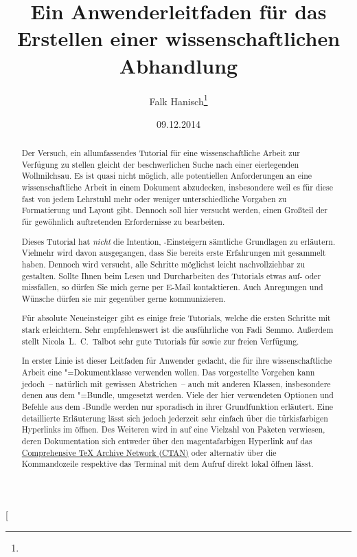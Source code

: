 \documentclass[%
  english,ngerman,%
  geometry=no,DIV=12,automark,%
]{tudscrartcl}
\begin{document}
\title{%
  Ein Anwenderleitfaden für das Erstellen einer wissenschaftlichen Abhandlung%
}
\author{Falk Hanisch\thanks{\noexpand\scriptsize\noexpand\Email{\tudscrmail}}}
\date{09.12.2014}
\makeatletter
\begingroup%
  \def\and{, }%
  \let\thanks\@gobble%
  \let\footnote\@gobble%
\endgroup%
\makeatother
\StartTutorial[%
  \begin{abstract}\noindent
  Der Versuch, ein allumfassendes Tutorial für eine wissenschaftliche Arbeit 
  zur Verfügung zu stellen gleicht der beschwerlichen Suche nach einer 
  eierlegenden Wollmilchsau. Es ist quasi nicht möglich, alle potentiellen 
  Anforderungen an eine wissenschaftliche Arbeit in einem Dokument abzudecken, 
  insbesondere weil es für diese fast von jedem Lehrstuhl mehr oder weniger 
  unterschiedliche Vorgaben zu Formatierung und Layout gibt. Dennoch soll hier 
  versucht werden, einen Großteil der für gewöhnlich auftretenden Erfordernisse 
  zu bearbeiten.
  
  Dieses Tutorial hat \emph{nicht} die Intention, -Einsteigern 
  sämtliche Grundlagen zu erläutern. Vielmehr wird davon ausgegangen, dass Sie 
  bereits erste Erfahrungen mit  gesammelt haben. Dennoch wird 
  versucht, alle Schritte möglichst leicht nachvollziehbar zu gestalten. Sollte 
  Ihnen beim Lesen und Durcharbeiten des Tutorials etwas auf- oder missfallen, 
  so dürfen Sie mich gerne per E-Mail kontaktieren. Auch Anregungen und Wünsche 
  dürfen sie mir gegenüber gerne kommunizieren.
  
  Für absolute Neueinsteiger gibt es einige freie Tutorials, welche die ersten 
  Schritte mit  stark erleichtern. Sehr empfehlenswert ist die 
  ausführliche  
  von Fadi~Semmo. Außerdem stellt Nicola~L.~C.~Talbot sehr gute Tutorials für 
  \cite{talbot2012} sowie 
  \cite{talbot2013} zur freien Verfügung.
  
  In erster Linie ist dieser Leitfaden für Anwender gedacht, die für ihre
  wissenschaftliche Arbeit eine \TUDScript"=Dokumentklasse verwenden wollen. 
  Das vorgestellte Vorgehen kann jedoch~-- natürlich mit gewissen Abstrichen~-- 
  auch mit anderen Klassen, insbesondere denen aus dem \KOMAScript"=Bundle, 
  umgesetzt werden. Viele der hier verwendeten Optionen und Befehle aus dem 
  \TUDScript-Bundle werden nur sporadisch in ihrer Grundfunktion erläutert. 
  Eine detaillierte Erläuterung lässt sich jedoch jederzeit sehr einfach über 
  die türkisfarbigen Hyperlinks im  
  öffnen. Des Weiteren wird in auf eine Vielzahl von Paketen verwiesen, deren 
  Dokumentation sich entweder über den magentafarbigen Hyperlink auf das 
  \href{http://www.ctan.org/}{Comprehensive TeX Archive Network (CTAN)} oder 
  alternativ über die Kommandozeile respektive das Terminal mit dem Aufruf 
   direkt lokal öffnen lässt.
  

\end{abstract}
\end{document}
